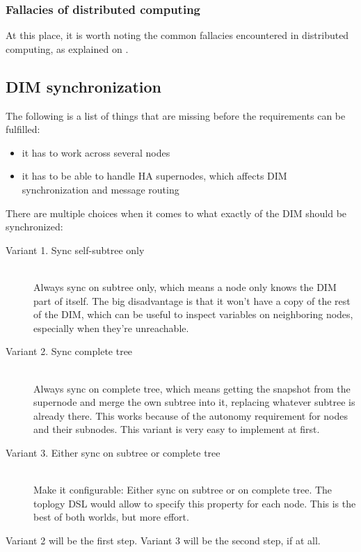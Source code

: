 \subsubsection{Fallacies of distributed computing}
At this place, it is worth noting the common fallacies encountered in
distributed computing, as explained on \cite{dcomp:fallacies}.

\subsection{DIM synchronization}
The following is a list of things that are missing before the requirements can be fulfilled:
\begin{itemize}
\item it has to work across several nodes
\item it has to be able to handle HA supernodes, which affects DIM synchronization and message routing
\end{itemize}

There are multiple choices when it comes to what exactly of the DIM should be synchronized:

\begin{description}
	\item [Variant 1. Sync self-subtree only] \hfill\\
	Always sync on subtree only, which means a node only knows the DIM part of
	itself. The big disadvantage is that it won't have a copy of the rest of the
	DIM, which can be useful to inspect variables on neighboring nodes, especially
	when they're unreachable.

	\item [Variant 2. Sync complete tree] \hfill\\
	Always sync on complete tree, which means getting the snapshot from the
	supernode and merge the own subtree into it, replacing whatever subtree is
	already there. This works because of the autonomy requirement for nodes and
	their subnodes. This variant is very easy to implement at first.

	\item [Variant 3. Either sync on subtree or complete tree] \hfill\\
	Make it configurable: Either sync on subtree or on complete tree. The
	toplogy DSL would allow to specify this property for each node. This is
	the best of both worlds, but more effort.
\end{description}

Variant 2 will be the first step. Variant 3 will be the second step, if at all.

